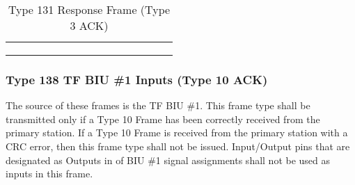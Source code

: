 \documentclass[]{article}
\begin{document}
\begin{landscape}
\begin{table}[]
\begin{tabular}{lllllllllllllll}
			&                     &                                &                    &              &                      &                   &  &              &                      &                   &  &                                                                                                 &                                              &                                                    \\
			&                     &                                &                    &              &                      &                   &  &              &                      &                   &  &                                                                                                 &                                              &                                                    \\
			&                     &                                &                    &              &                      &                   &  &              &                      &                   &  &                                                                                                 &                                              &                                                   
		\end{tabular}
		\caption{Type 131 Response Frame (Type 3 ACK)}
		\label{tab:type-131-frame}
	\end{table}
\end{landscape}

\subsubsection {Type 138 TF BIU \#1 Inputs (Type 10 ACK)}
The source of these frames is the TF BIU \#1. This frame type shall be transmitted only if a Type 10 Frame has been correctly received from the primary station. If a Type 10 Frame is received from the primary station with a CRC error, then this frame type shall not be issued. Input/Output pins that are designated as Outputs in  of BIU \#1 signal assignments shall not be used as inputs in this frame.

\clearpage
\end{document}

